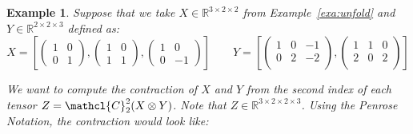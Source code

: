 \documentclass[11pt,a4paper,openright,oneside]{book}
\numberwithin{equation}{section}
\newtheorem{example0}[defn0]{Example}
\newenvironment{example}{ \begin{example0}\rm}{\end{example0}}
\newcommand{\exref}[1]{Example~\ref{#1}}
\begin{document}
\begin{example}
    Suppose that we take $X \in \mathbb{R}^{3 \times 2 \times 2}$ from \exref{exa:unfold} and
    $Y \in \mathbb{R}^{2 \times 2 \times 3}$ defined as:
  $$X = \left[\begin{pmatrix}
            1 & 0 \\
            0 & 1
        \end{pmatrix}, 
        \begin{pmatrix}
            1 & 0 \\
            1 & 1
        \end{pmatrix},
        \begin{pmatrix}
            1 & 0 \\
            0 & -1
        \end{pmatrix}
        \right] \qquad
  Y = \left[ 
    \begin{pmatrix}
        1 & 0 & -1 \\
        0 & 2 & -2 \\
    \end{pmatrix},
    \begin{pmatrix}
        1 & 1 & 0 \\
        2 & 0 & 2 \\
    \end{pmatrix}
    \right] $$

    We want to compute the contraction of $X$ and $Y$ from the second index of each tensor $Z = \mathcl{C}_2^2 (X \otimes Y)$.
    Note that $Z \in \mathbb{R}^{3 \times 2 \times 2 \times 3}$. Using the Penrose
    Notation, the contraction would look like:

    \begin{center}
    \hfill
\begin{minipage}{0.2\textwidth}
\end{minipage}
\end{center}
\end{example}
\end{document}
